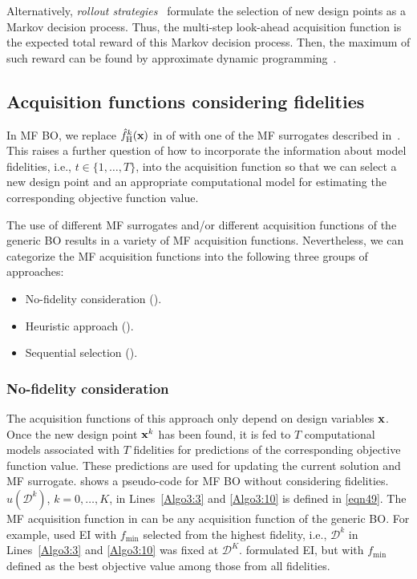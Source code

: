 \documentclass[journal ]{new-aiaa}
\begin{document}
Alternatively, \textit{rollout strategies}~\citep{Lam2016,Lee2020} formulate the selection of new design points as a Markov
decision process.
Thus, the multi-step look-ahead acquisition function is the expected total reward of this Markov
decision process.
Then, the maximum of such reward can be found by approximate dynamic programming~\citep{Powell2011}.

\subsection{Acquisition functions considering fidelities}\label{Sec52}

In MF BO, we replace $\hat{f}_\text{H}^k({\bf x})$ in  of  with one of the MF surrogates described in~.
This raises a further question of how to incorporate the information about model fidelities, i.e., $t \in \{1,\dots,T\}$, into the acquisition function so that we can select a new design point and an appropriate computational model for estimating the corresponding objective function value. 
 
The use of different MF surrogates and/or different acquisition functions of the generic BO results in a variety of MF acquisition functions. Nevertheless, we can categorize the MF acquisition functions into the following three groups of approaches: 
\begin{itemize}
	\item No-fidelity consideration ().
	
	\item Heuristic approach ().
	
	\item Sequential selection ().
	 
\end{itemize}

\subsubsection{No-fidelity consideration}\label{Sec521}

The acquisition functions of this approach only depend on design variables $\bf x$.
Once the new design point ${\bf x}^k$ has been found, it is fed to $T$ computational models associated with $T$ fidelities for predictions of the corresponding objective function value.
These predictions are used for updating the current solution and MF surrogate.
 shows a pseudo-code for MF BO without considering fidelities.
$u(\mathcal{D}^k)$, $k=0,\dots,K$, in Lines~\ref{Algo3:3} and \ref{Algo3:10} is defined in \cref{eqn49}.
The MF acquisition function in  can be any acquisition function of the generic BO.
For example, \citet{Forrester2007} used EI with $f_{\min}$ selected from the highest fidelity, i.e., $\mathcal{D}^k$ in Lines~\ref{Algo3:3} and \ref{Algo3:10} was fixed at $\mathcal{D}^K$.
\citet{Perdikaris2016} formulated EI, but with $f_{\min}$ defined as the best objective value among those from all fidelities.
 
\end{document}
